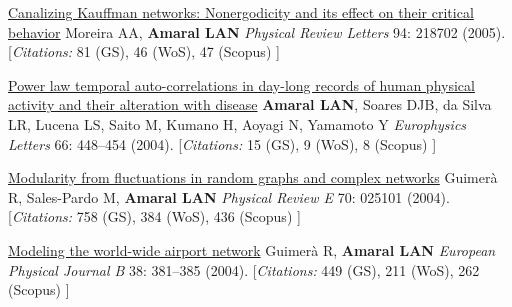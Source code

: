\NumberedItem{\makebox[0.8cm][r]{[58]}}
\href{/people/amaral/canalizing-kauffman-networks-nonergodicity-and-its-effect-on-their-critical-behavior}
{Canalizing Kauffman networks: Nonergodicity and its effect on their critical behavior}
\newline
Moreira AA, {\textbf{Amaral LAN}}
\newline
\textit{Physical Review Letters}
    94:
218702 (2005).
    \newline
    \hfill [{\em{Citations:}} 81 (GS),
    46 (WoS), 47 (Scopus)
    ]
\newline
\Gap
~
\Gap

\NumberedItem{\makebox[0.8cm][r]{[57]}}
\href{/people/amaral/power-law-temporal-auto-correlations-in-day-long-records-of-human-physical-activity-and-their-alteration-with-disease}
{Power law temporal auto-correlations in day-long records of human physical activity and their alteration with disease}
\newline
{\textbf{Amaral LAN}}, Soares DJB, da Silva LR, Lucena LS, Saito M, Kumano H, Aoyagi N, Yamamoto Y
\newline
\textit{Europhysics Letters}
    66:
448--454 (2004).
    \newline
    \hfill [{\em{Citations:}} 15 (GS),
    9 (WoS), 8 (Scopus)
    ]
\newline
\Gap
~
\Gap

\NumberedItem{\makebox[0.8cm][r]{[56]}}
\href{/people/amaral/modularity-from-fluctuations-in-random-graphs-and-complex-networks}
{Modularity from fluctuations in random graphs and complex networks}
\newline
Guimer\`a R, Sales-Pardo M, {\textbf{Amaral LAN}}
\newline
\textit{Physical Review E}
    70:
025101 (2004).
    \newline
    \hfill [{\em{Citations:}} 758 (GS),
    384 (WoS), 436 (Scopus)
    ]
\newline
\Gap
~
\Gap

\NumberedItem{\makebox[0.8cm][r]{[55]}}
\href{/people/amaral/modeling-the-world-wide-airport-network}
{Modeling the world-wide airport network}
\newline
Guimer\`a R, {\textbf{Amaral LAN}}
\newline
\textit{European Physical Journal B}
    38:
381--385 (2004).
    \newline
    \hfill [{\em{Citations:}} 449 (GS),
    211 (WoS), 262 (Scopus)
    ]
\newline
\Gap
~
\Gap

